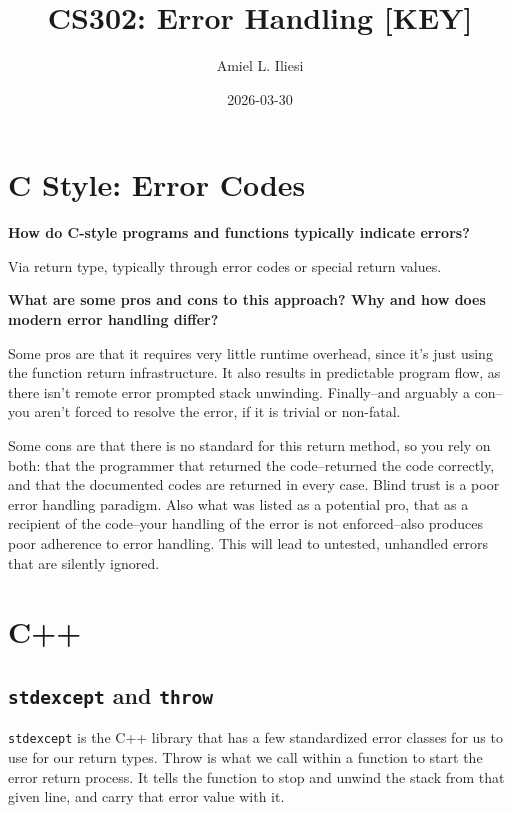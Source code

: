 \documentclass[12pt, letterpaper]{article}
\title{CS302: Error Handling \color{red}\textbf{[KEY]}\normalcolor}
\author{Amiel L. Iliesi}
\date{2026-03-30}
\newcommand{\question}[1]{\textbf{#1}\par}
\newenvironment{answerblock}{\color{Green4}}{\normalcolor\vspace{1em}}
\begin{document}
\maketitle

\tableofcontents

\pagebreak
\section{C Style: Error Codes}

\question{How do C-style programs and functions typically indicate errors?}

\begin{answerblock}
Via return type, typically through error codes or special return values.
\end{answerblock}

\question{What are some pros and cons to this approach? Why and how does modern
error handling differ?}

\begin{answerblock}
Some pros are that it requires very little runtime overhead, since it's just
using the function return infrastructure. It also results in predictable
program flow, as there isn't remote error prompted stack unwinding.
Finally--and arguably a con--you aren't forced to resolve the error, if it is
trivial or non-fatal.

Some cons are that there is no standard for this return method, so you rely on
both: that the programmer that returned the code--returned the code correctly,
and that the documented codes are returned in every case. Blind trust is a poor
error handling paradigm. Also what was listed as a potential pro, that as a
recipient of the code--your handling of the error is not enforced--also produces
poor adherence to error handling. This will lead to untested, unhandled errors
that are silently ignored.
\end{answerblock}

\pagebreak
\section{C++}

\subsection{\texttt{stdexcept} and \texttt{throw}}

\begin{answerblock}
\texttt{stdexcept} is the C++ library that has a few standardized error classes
for us to use for our return types. Throw is what we call within a function to
start the error return process. It tells the function to stop and unwind the
stack from that given line, and carry that error value with it.
\end{answerblock}
\end{document}
